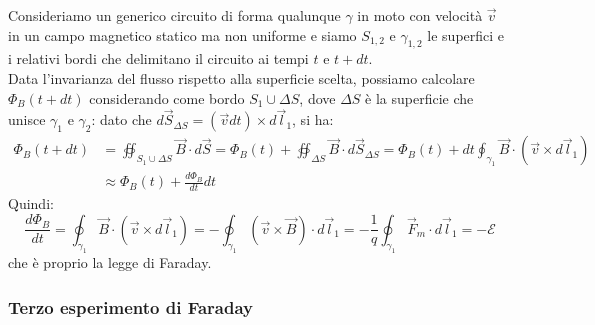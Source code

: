 \documentclass[]{article}
\newcommand{\E}{\mathcal{E}}
\begin{document}
Consideriamo un generico circuito di forma qualunque $ \gamma $ in moto con velocità $ \vec{v} $ in un campo magnetico statico ma non uniforme e siamo $ S_{1,2} $ e $ \gamma_{1,2} $ le superfici e i relativi bordi che delimitano il circuito ai tempi $ t $ e $ t + dt $. \\ 
%
Data l'invarianza del flusso rispetto alla superficie scelta, possiamo calcolare $ \Phi_B(t+dt) $ considerando come bordo $ S_1 \cup \Delta S $, dove $ \Delta S $ è la superficie che unisce $	\gamma_1 $ e $ \gamma_2 $: dato che $ d\vec{S}_{\Delta S} = (\vec{v}dt)\times d\vec{l}_1 $, si ha:
\begin{equation}
	\begin{split}
		\Phi_B(t+dt) &= \oiint_{S_1 \cup \Delta S} \vec{B}\cdot d\vec{S} = \Phi_B(t) + \oiint_{\Delta S} \vec{B}\cdot d\vec{S}_{\Delta S} = \Phi_B(t) + dt \oint_{\gamma_1} \vec{B}\cdot (\vec{v}\times d\vec{l}_1) \\ 
			     &\approx \Phi_B(t) + \frac{d\Phi_B}{dt} dt
	\end{split}
	\label{eq:8}
\end{equation}
Quindi:
\begin{equation}
	\frac{d\Phi_B}{dt} = \oint_{\gamma_1} \vec{B} \cdot (\vec{v}\times d\vec{l}_1) = - \oint_{\gamma_1} (\vec{v}\times\vec{B}) \cdot d\vec{l}_1 = -\frac{1}{q} \oint_{\gamma_1} \vec{F}_m \cdot d\vec{l}_1 = -\E
	\label{eq:9}
\end{equation}
che è proprio la legge di Faraday.

\subsubsection{Terzo esperimento di Faraday}
\end{document}
